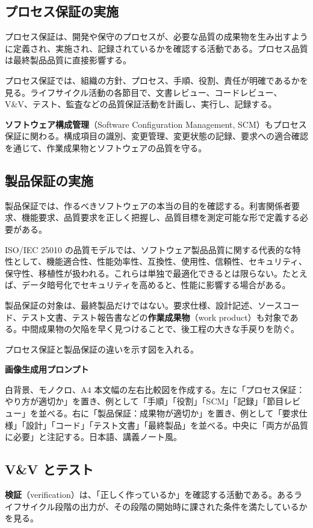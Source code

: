 \documentclass[11pt,a4paper]{article}
\newcommand{\term}[2]{\textbf{#1}（#2）}
\begin{document}
\subsection{プロセス保証の実施}
プロセス保証は、開発や保守のプロセスが、必要な品質の成果物を生み出すように定義され、実施され、記録されているかを確認する活動である。プロセス品質は最終製品品質に直接影響する。

プロセス保証では、組織の方針、プロセス、手順、役割、責任が明確であるかを見る。ライフサイクル活動の各節目で、文書レビュー、コードレビュー、V\&V、テスト、監査などの品質保証活動を計画し、実行し、記録する。

\term{ソフトウェア構成管理}{Software Configuration Management, SCM}もプロセス保証に関わる。構成項目の識別、変更管理、変更状態の記録、要求への適合確認を通じて、作業成果物とソフトウェアの品質を守る。

\subsection{製品保証の実施}
製品保証では、作るべきソフトウェアの本当の目的を確認する。利害関係者要求、機能要求、品質要求を正しく把握し、品質目標を測定可能な形で定義する必要がある。

ISO/IEC 25010 の品質モデルでは、ソフトウェア製品品質に関する代表的な特性として、機能適合性、性能効率性、互換性、使用性、信頼性、セキュリティ、保守性、移植性が扱われる。これらは単独で最適化できるとは限らない。たとえば、データ暗号化でセキュリティを高めると、性能に影響する場合がある。

製品保証の対象は、最終製品だけではない。要求仕様、設計記述、ソースコード、テスト文書、テスト報告書などの\term{作業成果物}{work product}も対象である。中間成果物の欠陥を早く見つけることで、後工程の大きな手戻りを防ぐ。

\begin{todobox}
プロセス保証と製品保証の違いを示す図を入れる。\par
\textbf{画像生成用プロンプト}\par
白背景、モノクロ、A4 本文幅の左右比較図を作成する。左に「プロセス保証：やり方が適切か」を置き、例として「手順」「役割」「SCM」「記録」「節目レビュー」を並べる。右に「製品保証：成果物が適切か」を置き、例として「要求仕様」「設計」「コード」「テスト文書」「最終製品」を並べる。中央に「両方が品質に必要」と注記する。日本語、講義ノート風。
\end{todobox}

\subsection{V\&V とテスト}
\term{検証}{verification}は、「正しく作っているか」を確認する活動である。あるライフサイクル段階の出力が、その段階の開始時に課された条件を満たしているかを見る。
\end{document}
